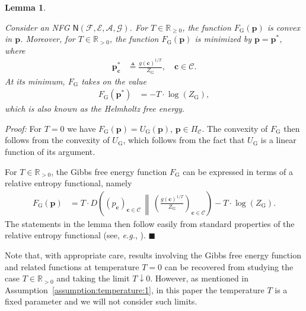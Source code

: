 \documentclass[journal, twocolumn]{IEEEtran}
\renewcommand{\mathbf}[1]{{\bm{#1}}}
\newcommand{\eg}{\emph{e.g.}}
\renewcommand{\geq}{\geqslant}
\newcommand{\Rp}{\mathbb{R}_{\geq 0}}
\newcommand{\Rpp}{\mathbb{R}_{>0}}
\newcommand{\vect}[1]{\mathbf{#1}}
\newcommand{\code}[1]{\mathcal{#1}}
\newcommand{\set}[1]{\mathcal{#1}}
\newcommand{\graph}[1]{\mathsf{#1}}
\newcommand{\defeq}{\triangleq}
\newcommand{\codeC}{\code{C}}
\newcommand{\codeCedge}{\code{C}}
\newcommand{\setA}{\set{A}}
\newcommand{\setE}{\set{E}}
\newcommand{\setF}{\set{F}}
\newcommand{\setG}{\set{G}}
\newcommand{\vc}{\vect{c}}
\newcommand{\vp}{\vect{p}}
\newcommand{\graphN}{\graph{N}}
\newcommand{\?}{\mathrm{?}}
\newcommand{\qedblack}{\hspace*{\fill}%
  $\blacksquare$\smallskip}
\newcommand{\FGibbs}{F_{\mathrm{G}}}
\newcommand{\UGibbs}{U_{\mathrm{G}}}
\newcommand{\ZGibbs}{Z_{\mathrm{G}}}
\newcommand{\setPi}{\Pi}
\newtheorem{Lemma}{Lemma}
\newenvironment{Proof}%
  {\noindent \emph{Proof:}}{\qedblack}
\begin{document}
\begin{Lemma}
  \label{lemma:F:Gibbs:minimum:1}

  Consider an NFG $\graphN(\setF,\setE, \setA, \setG)$. For $T \in \Rp$, the
  function $\FGibbs(\vp)$ is convex in $\vp$. Moreover, for $T \in \Rpp$, the
  function $\FGibbs(\vp)$ is minimized by $\vp = \vp^{*}$, where
  \begin{align}
    \vp^{*}_{\vc}
      &\defeq
         \frac{g(\vc)^{1/T}}
              {\ZGibbs},
           \quad \vc \in \codeCedge.
             \label{eq:F:Gibbs:minimum:location:1}
  \end{align}
  At its minimum, $\FGibbs$ takes on the value
  \begin{align}
    \FGibbs(\vp^{*})
      &= -
         T
         \cdot
         \log
           (
             \ZGibbs
           ),
             \label{eq:Z:Gibbs:2}
  \end{align}
  which is also known as the Helmholtz free energy.
\end{Lemma}



\begin{Proof}
  For $T = 0$ we have $\FGibbs(\vp) = \UGibbs(\vp)$, $\vp \in
  \setPi_{\codeC}$. The convexity of $\FGibbs$ then follows from the convexity
  of $\UGibbs$, which follows from the fact that $\UGibbs$ is a linear
  function of its argument.

  For $T \in \Rpp$, the Gibbs free energy function $\FGibbs$ can be expressed
  in terms of a relative entropy functional, namely
  \begin{align*}
    \FGibbs(\vp)
      &= T
         \cdot
         D
           \left(
               (p_{\vc})_{\vc \in \codeCedge}
             \ \middle\Vert \ 
               \left( \frac{g(\vc)^{1/T}}{\ZGibbs} \right)_{\!\! \vc \in \codeCedge}
           \right)
         -
         T
         \cdot
         \log(\ZGibbs).
  \end{align*}
  The statements in the lemma then follow easily from standard properties of
  the relative entropy functional (see, \eg, \cite{Cover:Thomas:91}).
\end{Proof}


Note that, with appropriate care, results involving the Gibbs free energy
function and related functions at temperature $T = 0$ can be recovered from
studying the case $T \in \Rpp$ and taking the limit $T \downarrow 0$. However,
as mentioned in Assumption~\ref{assumption:temperature:1}, in this paper the
temperature $T$ is a fixed parameter and we will not consider such limits.
\end{document}
